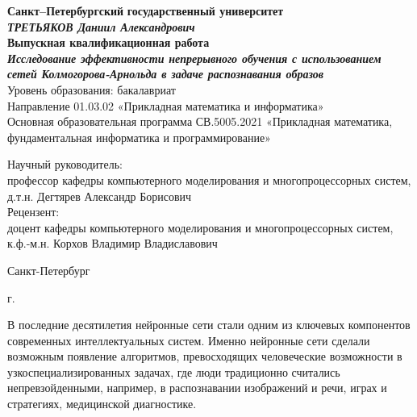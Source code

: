\documentclass[a4paper,14pt]{extarticle}
\begin{document}
\begin{titlepage}
    \begin{center}
        \textbf{Санкт--Петербургский}
        \textbf{государственный университет}
        \vspace{35mm}\\
        \textbf{\textit{\large ТРЕТЬЯКОВ Даниил Александрович}} \\[8mm]
        \textbf{\large Выпускная квалификационная работа}\\[3mm]
        \textbf{\textit{\large Исследование эффективности непрерывного обучения с 
        использованием сетей Колмогорова-Арнольда в задаче распознавания образов}}
        \vspace{20mm}\\
        Уровень образования: бакалавриат\\
        Направление 01.03.02 «Прикладная математика и информатика»\\
        Основная образовательная программа СВ.5005.2021
        «Прикладная математика, фундаментальная информатика и
        программирование»\\[25mm]
        \begin{flushright}
            \begin{minipage}[t]{0.65\textwidth}
                {Научный руководитель:} \\
                профессор кафедры компьютерного моделирования и
                многопроцессорных систем, д.т.н. Дегтярев Александр Борисович
                \vspace{10mm}\\
                {Рецензент:} \\
                доцент кафедры компьютерного моделирования и многопроцессорных
                систем, к.ф.-м.н. Корхов Владимир Владиславович
            \end{minipage}
        \end{flushright}
        \vfill
        {Санкт-Петербург}
        \par{\the\year{} г.}
    \end{center}
\end{titlepage}
\restoregeometry
\addtocounter{page}{1}
\tableofcontents
\pagebreak


В последние десятилетия нейронные сети стали одним из ключевых компонентов
современных интеллектуальных систем. Именно нейронные сети сделали возможным появление алгоритмов, превосходящих 
человеческие возможности в узкоспециализированных задачах, где люди традиционно
считались непревзойденными, например, в распознавании изображений и речи, играх
и стратегиях, медицинской диагностике.
\end{document}
